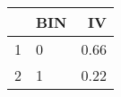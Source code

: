 \begin{table}[ht]
\centering
\begin{tabular}{rlr}
  \hline
 & BIN & IV \\ 
  \hline
1 & 0 & 0.66 \\ 
  2 & 1 & 0.22 \\ 
   \hline
\end{tabular}
\end{table}
